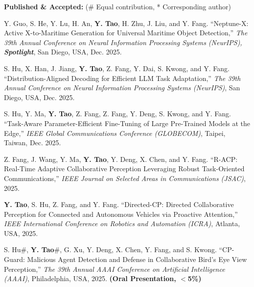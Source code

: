 \documentclass[letterpaper,11pt]{article}
\begin{document}
{{{{{{\large\textbf{Published \& Accepted:} (\# Equal contribution, * Corresponding author)

\begin{justify}
    \normalsize
    Y. Guo, S. He, Y. Lu, H. An, \textbf{Y. Tao}, H. Zhu, J. Liu, and Y. Fang. ``Neptune-X: Active X-to-Maritime Generation for Universal Maritime Object Detection,'' \textit{The 39th Annual Conference on Neural Information Processing Systems (NeurIPS), \textbf{Spotlight}}, San Diego, USA, Dec. 2025.
\end{justify}

\begin{justify}
    \normalsize
    S. Hu, X. Han, J. Jiang, \textbf{Y. Tao}, Z. Fang, Y. Dai, S. Kwong, and Y. Fang. ``Distribution-Aligned Decoding for Efficient LLM Task Adaptation,'' \textit{The 39th Annual Conference on Neural Information Processing Systems (NeurIPS)}, San Diego, USA, Dec. 2025.
\end{justify}
\begin{justify}
    \normalsize
    S. Hu, Y. Ma, \textbf{Y. Tao},  Z. Fang, Z. Fang, Y. Deng, S. Kwong, and Y. Fang. ``Task-Aware Parameter-Efficient Fine-Tuning of Large Pre-Trained Models at the Edge,'' \textit{IEEE Global Communications Conference (GLOBECOM)}, Taipei, Taiwan, Dec. 2025.
\end{justify}
\begin{justify}
    \normalsize
    Z. Fang, J. Wang, Y. Ma, \textbf{Y. Tao}, Y. Deng, X. Chen, and Y. Fang. ``R-ACP: Real-Time Adaptive Collaborative Perception Leveraging Robust Task-Oriented Communications,'' \textit{IEEE Journal on Selected Areas in Communications (JSAC)}, 2025.
\end{justify}
\begin{justify}
    \normalsize
    \textbf{Y. Tao}, S. Hu, Z. Fang, and Y. Fang. ``Directed-CP: Directed Collaborative Perception for Connected and Autonomous Vehicles via Proactive Attention,'' \textit{IEEE International Conference on Robotics and Automation (ICRA)}, Atlanta, USA, 2025.
\end{justify}
\begin{justify}
    \normalsize
    S. Hu\#, \textbf{Y. Tao}\#, G. Xu, Y. Deng, X. Chen, Y. Fang, and S. Kwong. ``CP-Guard: Malicious Agent Detection and Defense in Collaborative Bird's Eye View Perception,'' \textit{The 39th Annual AAAI Conference on Artificial Intelligence (AAAI)}, Philadelphia, USA, 2025. \textbf{(Oral Presentation, $<$5\%)}
\end{justify}
\begin{justify}

\end{justify}}}}}}}
\end{document}
